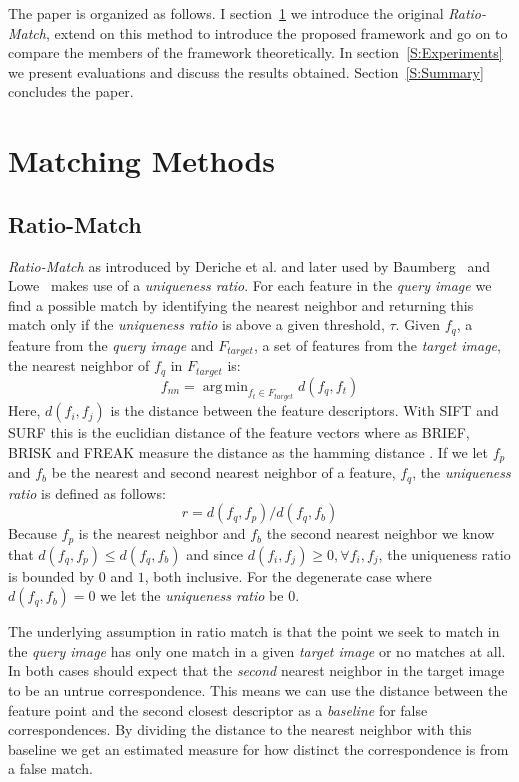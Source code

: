 \documentclass[journal]{IEEEtran}
\DeclareMathOperator*{\argmin}{arg\,min}
\begin{document}
The paper is organized as follows. I section~\ref{S:MatchingMethods} we 
introduce the original \emph{Ratio-Match}, extend on this method to 
introduce the proposed framework and go on to compare the members of the 
framework theoretically.  In section~\ref{S:Experiments} we present 
evaluations and discuss the results obtained.  Section~\ref{S:Summary} 
concludes the paper.

\section{Matching Methods}
\label{S:MatchingMethods}
%
\subsection{Ratio-Match}
%
\emph{Ratio-Match} as introduced by Deriche et al.
\cite{deriche1994robust} and later used by 
Baumberg~\cite{baumberg2000reliable} and Lowe~\cite{lowe2004sift} makes 
use of a \emph{uniqueness ratio}. For each feature in the \emph{query 
image} we find a possible match by identifying the nearest neighbor and 
returning this match only if the \emph{uniqueness ratio} is above a 
given threshold, $\tau$. Given $f_q$, a feature from the \emph{query 
image} and $F_{target}$, a set of features from the \emph{target image}, 
the nearest neighbor of $f_q$ in $F_{target}$ is:
\begin{equation*}
    f_{nn} = \argmin_{f_t \in F_{target}} d(f_q, f_t)
\end{equation*}
Here, $d(f_i, f_j)$ is the distance between the feature descriptors.  
With SIFT and SURF this is the euclidian distance of the feature vectors
\cite{lowe2004sift} \cite{bay2006surf} where as BRIEF, BRISK and FREAK 
measure the distance as the hamming distance \cite{leutenegger2011brisk} 
\cite{calonder2010brief} \cite{alahi2012freak}.  If we let $f_p$ and 
$f_b$ be the nearest and second nearest neighbor of a feature, $f_q$, 
the \emph{uniqueness ratio} is defined as follows:
\begin{equation*}
    r = d(f_q, f_p) / d(f_q, f_b)
\end{equation*}
Because $f_p$ is the nearest neighbor and $f_b$ the second nearest 
neighbor we know that $d(f_q, f_p) \leq d(f_q, f_b)$ and since $d(f_i, 
f_j) \geq 0, \forall f_i,f_j$, the uniqueness ratio is bounded by $0$ 
and $1$, both inclusive. For the degenerate case where $d(f_q, f_b) = 0$
we let the \emph{uniqueness ratio} be $0$.

The underlying assumption in ratio match is that the point we seek to 
match in the \emph{query image} has only one match in a given 
\emph{target image} or no matches at all. In both cases should expect 
that the \emph{second} nearest neighbor in the target image to be an 
untrue correspondence.  This means we can use the distance between the 
feature point and the second closest descriptor as a \emph{baseline} for 
false correspondences. By dividing the distance to the nearest neighbor 
with this baseline we get an estimated measure for how distinct the 
correspondence is from a false match.  
\end{document}
